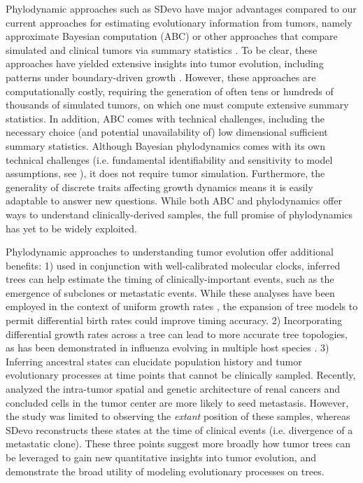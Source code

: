 \documentclass[12pt]{elife_based}
\begin{document}
Phylodynamic approaches such as SDevo have major advantages compared to our current approaches for estimating evolutionary information from tumors, namely approximate Bayesian computation (ABC) \citep{beaumont2002approximate} or other approaches that compare simulated and clinical tumors via summary statistics \citep{noble2022}. To be clear, these approaches have yielded extensive insights into tumor evolution, including patterns under boundary-driven growth \citep{sottoriva2015big, sun2017between, Chkhaidze:2019uw, Heide2021.07.14.451265}. However, these approaches are computationally costly, requiring the generation of often tens or hundreds of thousands of simulated tumors, on which one must compute extensive summary statistics. In addition, ABC comes with technical challenges, including the necessary choice (and potential unavailability of) low dimensional sufficient summary statistics. Although Bayesian phylodynamics comes with its own technical challenges (i.e. fundamental identifiability and sensitivity to model assumptions, see \cite{Louca2020, Louca2021}), it does not require tumor simulation. Furthermore, the generality of discrete traits affecting growth dynamics means it is easily adaptable to answer new questions. While both ABC and phylodynamics offer ways to understand clinically-derived samples, the full promise of phylodynamics has yet to be widely exploited.

Phylodynamic approaches to understanding tumor evolution offer additional benefits: 1) used in conjunction with well-calibrated molecular clocks, inferred trees can help estimate the timing of clinically-important events, such as the emergence of subclones or metastatic events. While these analyses have been employed in the context of uniform growth rates \citep{lote2017carbon, hu2020multi, Alves:2019wk}, the expansion of tree models to permit differential birth rates could improve timing accuracy. 2) Incorporating differential growth rates across a tree can lead to more accurate tree topologies, as has been demonstrated in influenza evolving in multiple host species \citep{worobey2014synchronized}. 3) Inferring ancestral states can elucidate population history and tumor evolutionary processes at time points that cannot be clinically sampled. Recently, \cite{zhao2021selection} analyzed the intra-tumor spatial and genetic architecture of renal cancers and concluded cells in the tumor center are more likely to seed metastasis. However, the study was limited to observing the \emph{extant} position of these samples, whereas SDevo reconstructs these states at the time of clinical events (i.e. divergence of a metastatic clone). These three points suggest more broadly how tumor trees can be leveraged to gain new quantitative insights into tumor evolution, and demonstrate the broad utility of modeling evolutionary processes on trees. 
\end{document}
